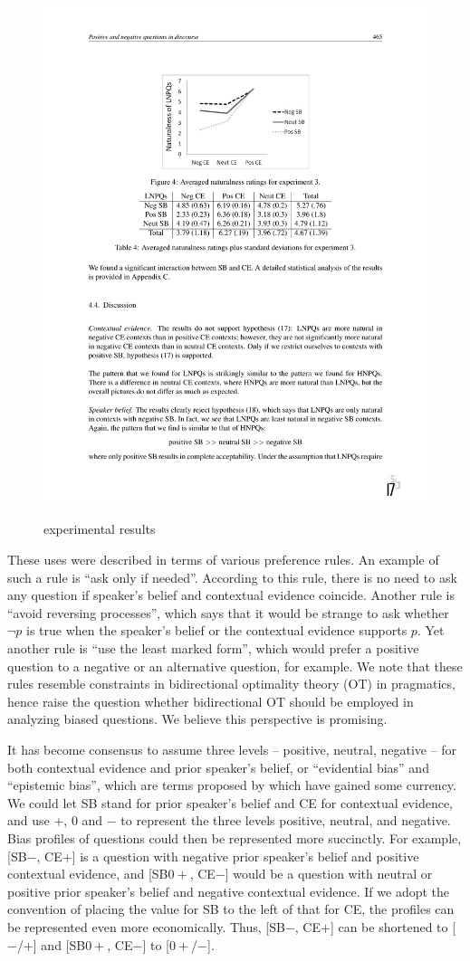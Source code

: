 \documentclass[output=paper,colorlinks,citecolor=brown]{langscibook}
\begin{document}
\begin{figure}
{\includegraphics[width=.45\textwidth]{figures/Roelofsen-LNPQ.pdf}
}
\caption{ experimental results}
\label{pic:123}
\end{figure}


These uses were described in terms of various preference rules. An example of such a rule is ``ask only if needed''. According to this rule, there is no need to ask any question if speaker's belief and contextual evidence coincide. Another rule is ``avoid reversing processes'', which says that it would be strange to ask whether $\neg p$ is true when the speaker's belief or the contextual evidence supports $p$. Yet another rule is ``use the least marked form'', which would prefer a positive question to a negative or an alternative question, for example. We note that these rules resemble constraints in bidirectional optimality theory (OT) in pragmatics, hence raise the question whether bidirectional OT should be employed in analyzing biased questions. We believe this perspective is promising.

It has become consensus to assume three levels -- positive, neutral, negative -- for both contextual evidence and prior speaker's belief, or ``evidential bias'' and ``epistemic bias'', which are terms proposed by \citet{sudo2013biased} which have gained some currency. We could let SB stand for prior speaker's belief and CE for contextual evidence, and use $+$, $0$ and $-$ to represent the three levels positive, neutral, and negative. %
Bias profiles of questions could then be represented more succinctly. For example, [SB$-$, CE$+$] is a question with negative prior speaker's belief and positive contextual evidence, and [SB$0+$, CE$-$] would be a question with neutral or positive prior speaker's belief and negative contextual evidence. If we adopt the convention of placing the value for SB to the left of that for CE, the profiles can be represented even more economically. Thus, [SB$-$, CE$+$] can be shortened to [$-$/$+$] and [SB$0+$, CE$-$] to [$0+$/$-$]. %
\end{document}
